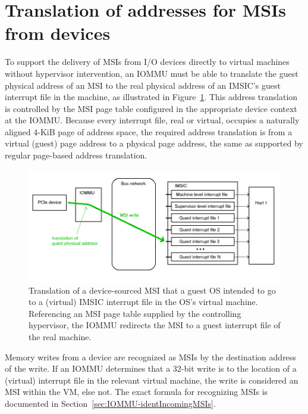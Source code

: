 \section{Translation of addresses for MSIs from devices}

To support the delivery of MSIs from I/O devices directly to {\RISCV}
virtual machines without hypervisor intervention, an \mbox{IOMMU} must be
able to translate the guest physical address of an MSI to the real
physical address of an IMSIC's guest interrupt file in the machine, as
illustrated in Figure~\ref{fig:IOMMU-guestIntrFiles}.
This address translation is controlled by the MSI page table configured
in the appropriate device context at the \mbox{IOMMU}.
Because every interrupt file, real or virtual, occupies a naturally
aligned \mbox{4-KiB} page of address space, the required address
translation is from a virtual (guest) page address to a physical page
address, the same as supported by regular {\RISCV} page-based address
translation.

\begin{figure}[th]
\centerline{\includegraphics[scale=0.55]{IOMMU-guestIntrFiles.png}}
\caption{%
Translation of a device-sourced MSI that a guest OS intended to go to
a (virtual) IMSIC interrupt file in the OS's virtual machine.
Referencing an MSI page table supplied by the controlling hypervisor,
the \mbox{IOMMU} redirects the MSI to a guest interrupt file of the real
machine.%
}
\label{fig:IOMMU-guestIntrFiles}
\end{figure}

Memory writes from a device are recognized as MSIs by the destination
address of the write.
If an \mbox{IOMMU} determines that a \mbox{32-bit} write is to the location
of a (virtual) interrupt file in the relevant virtual machine, the
write is considered an MSI within the VM, else not.
The exact formula for recognizing MSIs is documented in
Section~\ref{sec:IOMMU-identIncomingMSIs}.

